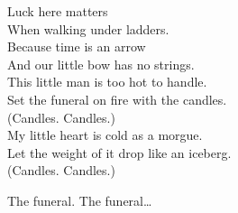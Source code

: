 Luck here matters \\
When walking under ladders. \\
Because time is an arrow \\
And our little bow has no strings. \\

This little man is too hot to handle. \\
Set the funeral on fire with the candles. \\
(Candles. Candles.) \\

My little heart is cold as a morgue. \\
Let the weight of it drop like an iceberg. \\
(Candles. Candles.) \\




The funeral. The funeral… \\
